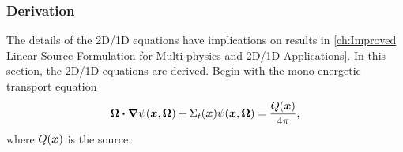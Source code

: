 {{{      \DeclareDocumentCommand{\aflux}{}{\psi}
      \DeclareDocumentCommand{\dir}{}{\vec{\Omega}}

      \subsubsection{Derivation}{\label{sssec:3T:Derivation}
        The details of the 2D/1D equations have implications on results in \cref{ch:Improved Linear Source Formulation for Multi-physics and 2D/1D Applications}.
        In this section, the 2D/1D equations are derived.
        Begin with the mono-energetic transport equation
        \begin{equation}\label{eq:2D/1D:Transport}
          \dir\vdot\grad\aflux(\loc,\dir) + \xst(\loc)\aflux(\loc,\dir) = \frac{Q(\loc)}{\fourpi},
        \end{equation}
        where $Q(\boldsymbol{x})$ is the source.

}}}}
